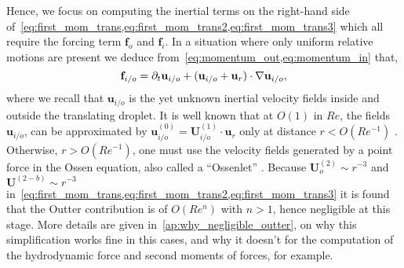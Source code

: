 Hence, we focus on computing the inertial terms on the right-hand side of~\ref{eq:first_mom_trans,eq:first_mom_trans2,eq:first_mom_trans3} which all require the forcing term $\textbf{f}_o$ and $\textbf{f}_i$. 
In a situation where only uniform relative motions are present we deduce from~\ref{eq:momentum_out,eq:momentum_in} that, 
\begin{equation}
    \textbf{f}_{i/o} = \partial_t \textbf{u}_{i/o} + (\textbf{u}_{i/o} + \textbf{u}_r)\cdot \mathbf{\nabla} \textbf{u}_{i/o},
\end{equation}
where we recall that $\textbf{u}_{i/o}$ is the yet unknown inertial velocity fields inside and outside the translating droplet. 
It is well known that at $O(1)$ in $Re$, the fields $\textbf{u}_{i/o}$, can be approximated by $\textbf{u}_{i/o}^{(0)} = \textbf{U}^{(1)}_{i/o}\cdot \textbf{u}_r$ only at distance $r < O(Re^{-1})$ \citet{proudman1957expansions}. 
Otherwise, $r > O(Re^{-1})$, one must use the velocity fields generated by a point force in the Ossen equation, also called a ``Ossenlet'' \citep{pozrikidis2011introduction}. 
Because $\textbf{U}_o^{(2)}\sim r^{-3}$ and $\textbf{U}^{(2-b)}\sim r^{-3}$ in~\ref{eq:first_mom_trans,eq:first_mom_trans2,eq:first_mom_trans3} it is found that the Outter contribution is of $O(Re^n)$ with $n >1$, hence negligible at this stage. 
More details are given in~\ref{ap:why_negligible_outter}, on why this simplification works fine in this cases, and why it doesn't for the computation of the hydrodynamic force and second moments of forces, for example. 
